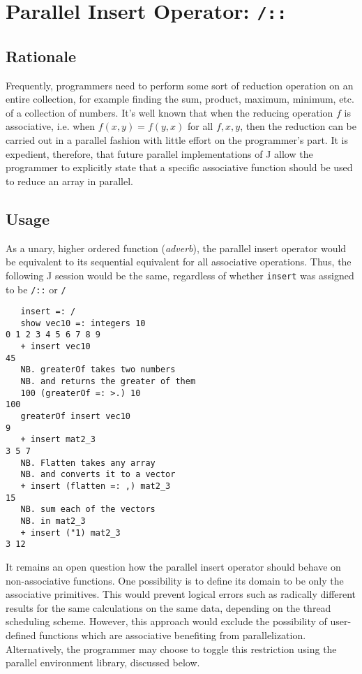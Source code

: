 \section{Parallel Insert Operator: \texttt{/::}}
\label{pins}
\subsection{Rationale}
Frequently, programmers need to perform some sort of reduction operation on an entire collection, 
for example finding the sum, product, maximum, minimum, etc. of a collection of numbers.
It's well known that when the reducing operation $f$ is associative, i.e. when $f(x,y) = f(y,x)$ for all $f, x, y$, 
then the reduction can be carried out in a parallel fashion with little effort on the programmer's part.
It is expedient, therefore, that future parallel implementations of J allow the programmer 
to explicitly state that a specific associative function should be used to reduce an array in parallel.

\subsection{Usage}
As a unary, higher ordered function (\textit{adverb}), 
the parallel insert operator would be equivalent to its sequential equivalent 
for all associative operations. 
Thus, the following J session would be the same, 
regardless of whether \texttt{insert}
was assigned to be \texttt{/::} or \texttt{/}

\begin{singlespacing}
\begin{small}
\begin{verbatim}
   insert =: /
   show vec10 =: integers 10
0 1 2 3 4 5 6 7 8 9
   + insert vec10
45
   NB. greaterOf takes two numbers
   NB. and returns the greater of them
   100 (greaterOf =: >.) 10
100
   greaterOf insert vec10
9
   + insert mat2_3
3 5 7
   NB. Flatten takes any array
   NB. and converts it to a vector
   + insert (flatten =: ,) mat2_3
15
   NB. sum each of the vectors
   NB. in mat2_3
   + insert ("1) mat2_3
3 12
\end{verbatim}
\end{small}
\end{singlespacing}

It remains an open question how the parallel insert operator should behave on non-associative functions.
One possibility is to define its domain to be only the associative primitives. 
This would prevent logical errors such as radically different results for the same calculations on the same data, 
depending on the thread scheduling scheme. 
However, this approach would exclude the possibility of 
user-defined functions which are associative benefiting from parallelization.
Alternatively, the programmer may choose to toggle this restriction using the parallel environment library, 
discussed below.

